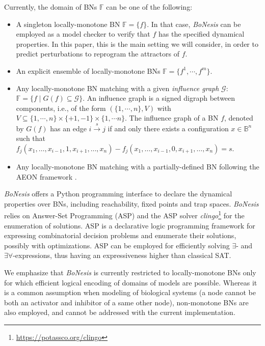 \documentclass[PCJ,Unicode,screen,mode=plain]{cedram}
\begin{document}
Currently, the domain of BNs \(\mathbb F\) can be one of the following:

\begin{itemize}
\item
  A singleton locally-monotone BN \(\mathbb F=\{f\}\). In that case,
  \emph{BoNesis} can be employed as a model checker to verify that \(f\)
  has the specified dynamical properties. In this paper, this is the
  main setting we will consider, in order to predict perturbations to
  reprogram the attractors of \(f\).
\item
  An explicit ensemble of locally-monotone BNs
  \(\mathbb F=\{ f^1,\cdots, f^m \}\).
\item
  Any locally-monotone BN matching with a given \emph{influence graph}
  \(\mathcal G\): \(\mathbb F = \{ f\mid G(f)\subseteq \mathcal G\}\).
  An influence graph is a signed digraph between components, i.e., of
  the form \((\{1,\cdots,n\},V)\) with
  \(V\subseteq \{1,\cdots,n\}\times \{+1,-1\}\times \{1,\cdots n\}\).
  The influence graph of a BN \(f\), denoted by \(G(f)\) has an edge
  \(i\xrightarrow{s} j\) if and only there exists a configuration
  \(x\in\mathbb B^n\) such that
  \(f_j(x_1, \ldots, x_{i-1}, 1, x_{i+1},\ldots, x_n) - f_j(x_1, \ldots, x_{i-1}, 0, x_{i+1},\ldots, x_n) = s\).
\item
  Any locally-monotone BN matching with a partially-defined BN following
  the AEON framework \citep{Benes2021}.
\end{itemize}

\emph{BoNesis} offers a Python programming interface to declare the
dynamical properties over BNs, including reachability, fixed points and
trap spaces. \emph{BoNesis} relies on Answer-Set Programming (ASP) and
the ASP solver \emph{clingo}\footnote{\url{https://potassco.org/clingo}} for the
enumeration of solutions. ASP is a declarative logic programming
framework for expressing combinatorial decision problems and enumerate
their solutions, possibly with optimizations. ASP can be employed for
efficiently solving \(\exists\)- and \(\exists\forall\)-expressions,
thus having an expressiveness higher than classical SAT.

We emphasize that \emph{BoNesis} is currently restricted to
locally-monotone BNs only for which efficient logical encoding of
domains of models are possible. Whereas it is a common assumption when
modeling of biological systems (a node cannot be both an activator and
inhibitor of a same other node), non-monotone BNs are also employed, and
cannot be addressed with the current implementation.
\end{document}
